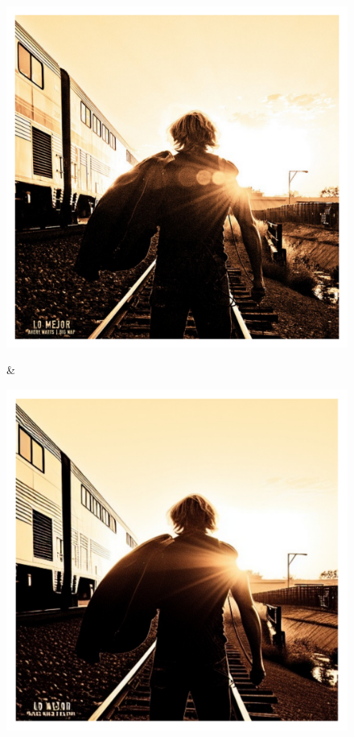 \documentclass[letterpaper]{article} %
\begin{document}
\begin{figure}
\begin{tabular}
\begin{minipage}{\linewidth}
    \end{minipage}
    \\
    \begin{minipage}{\linewidth}
        \includegraphics[width=\linewidth]{original_compare/90.pdf}
    \end{minipage} &
    \begin{minipage}{\linewidth}
        \includegraphics[width=\linewidth]{Ours_compare/90.pdf}

\end{minipage}
\end{tabular}
\end{figure}
\end{document}
